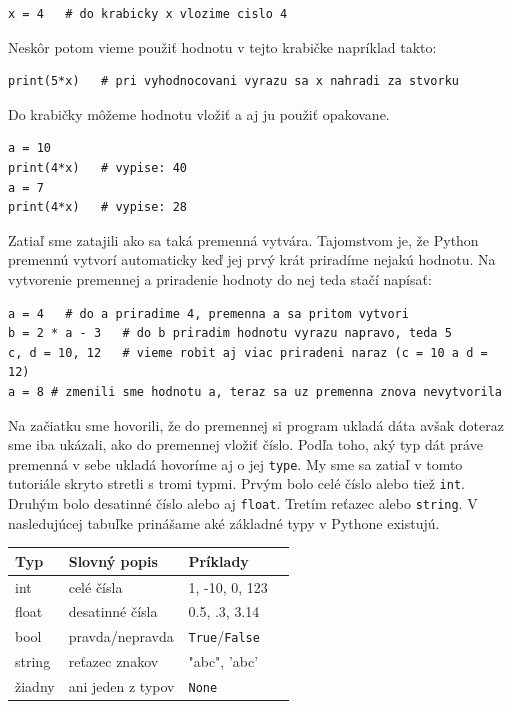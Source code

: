 \documentclass{article}
\begin{document}
\begin{lstlisting}
x = 4   # do krabicky x vlozime cislo 4
\end{lstlisting}

Neskôr potom vieme použiť hodnotu v tejto krabičke napríklad takto:

\begin{lstlisting}
print(5*x)   # pri vyhodnocovani vyrazu sa x nahradi za stvorku
\end{lstlisting}

Do krabičky môžeme hodnotu vložiť a aj ju použiť opakovane.

\begin{lstlisting}
a = 10
print(4*x)   # vypise: 40
a = 7
print(4*x)   # vypise: 28
\end{lstlisting}

Zatiaľ sme zatajili ako sa taká premenná vytvára. Tajomstvom je, že Python premennú vytvorí automaticky keď jej prvý krát priradíme nejakú hodnotu. Na vytvorenie premennej a priradenie hodnoty do nej teda stačí napísať:

\begin{lstlisting}
a = 4   # do a priradime 4, premenna a sa pritom vytvori
b = 2 * a - 3   # do b priradim hodnotu vyrazu napravo, teda 5
c, d = 10, 12   # vieme robit aj viac priradeni naraz (c = 10 a d = 12)
a = 8 # zmenili sme hodnotu a, teraz sa uz premenna znova nevytvorila
\end{lstlisting}

Na začiatku sme hovorili, že do premennej si program ukladá dáta avšak doteraz sme iba ukázali, ako do premennej vložiť číslo. Podľa toho, aký typ dát práve premenná v sebe ukladá hovoríme aj o jej \texttt{type}. My sme sa zatiaľ v tomto tutoriále skryto stretli s tromi typmi. Prvým bolo celé číslo alebo tiež \texttt{int}. Druhým bolo desatinné číslo alebo aj \texttt{float}. Tretím reťazec alebo \texttt{string}. V nasledujúcej tabuľke prinášame aké základné typy v Pythone existujú.

\smallskip
\begin{tabular}{|l|l|l|l|}
\hline
Typ & Slovný popis & Príklady \\ \hline
int & celé čísla & 1, -10, 0, 123 \\ \hline
float & desatinné čísla & 0.5, .3, 3.14  \\ \hline
bool & pravda/nepravda & \texttt{True}/\texttt{False} \\ \hline
string & reťazec znakov & "abc", 'abc' \\ \hline
žiadny & ani jeden z typov & \texttt{None} \\ \hline
\end{tabular}
\smallskip
\end{document}
